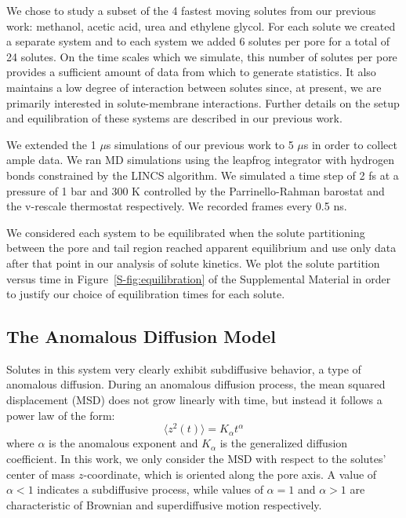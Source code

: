 \documentclass[aps,pre,preprint,groupedaddress,longbibliography]{revtex4-2}
\begin{document}
  We chose to study a subset of the 4 fastest moving solutes from our previous
  work: methanol, acetic acid, urea and ethylene glycol. For each solute we 
  created a separate system and to each system we added 6 solutes per pore 
  for a total of 24 solutes. On the time scales which we simulate, this number
  of solutes per pore provides a sufficient amount of data from which to 
  generate statistics. It also maintains a low degree of interaction between
  solutes since, at present, we are primarily interested in solute-membrane 
  interactions. Further details on the setup and equilibration of these systems
  are described in our previous work.\cite{coscia_chemically_2019}
  
  We extended the 1 $\mu$s simulations of our previous work to 5 $\mu$s in order
  to collect ample data. We ran MD simulations using the leapfrog integrator with 
  hydrogen bonds constrained by the LINCS algorithm. We simulated a time step of 2 fs at
  a pressure of 1 bar and 300 K controlled by the Parrinello-Rahman barostat and
  the v-rescale thermostat respectively. We recorded frames every 0.5 ns.
  
  We considered each system to be equilibrated when the solute partitioning between the 
  pore and tail region reached apparent equilibrium and use only data after that point
  in our analysis of solute kinetics. We plot the solute partition versus time in
  Figure~\ref{S-fig:equilibration} of the Supplemental Material in order to justify
  our choice of equilibration times for each solute.

  \subsection{The Anomalous Diffusion Model}\label{method:model_sFBM}

  Solutes in this system very clearly exhibit subdiffusive behavior, a type of
  anomalous diffusion. During an anomalous diffusion process, the mean squared 
  displacement (MSD) does not grow linearly with time, but instead it follows 
  a power law of the form: 
  \begin{equation} 
  \langle z^2(t) \rangle = K_{\alpha}t^{\alpha}
  \label{eqn:msd_form}
  \end{equation} 
  where $\alpha$ is the anomalous exponent and $K_{\alpha}$ is the generalized 
  diffusion coefficient. In this work, we only consider the MSD with respect to
  the solutes' center of mass $z$-coordinate, which is oriented along the pore 
  axis. A value of $\alpha < 1$ indicates a subdiffusive process, while values
  of $\alpha = 1$ and $\alpha > 1$ are characteristic of Brownian and 
  superdiffusive motion respectively.
 
\end{document}
